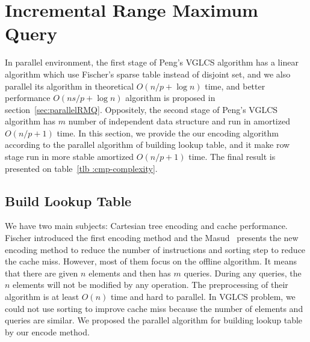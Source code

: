 \section{Incremental Range Maximum Query}
\label{sec:parallelIRMQ}

In parallel environment, the first stage of Peng's VGLCS algorithm has
a linear algorithm which use Fischer's sparse table instead of
disjoint set, and we also parallel its algorithm in theoretical $O(n /
p + \log n)$ time, and better performance $O(n s / p + \log n)$
algorithm is proposed in section~\ref{sec:parallelRMQ}.  Oppositely,
the second stage of Peng's VGLCS algorithm has $m$ number of
independent data structure and run in amortized $O(n / p + 1)$ time.
In this section, we provide the our encoding algorithm according to
the parallel algorithm of building lookup table, and it make row stage
run in more stable amortized $O(n / p + 1)$ time.  The final result is
presented on table~\ref{tlb :cmp-complexity}.

\iffalse VGLCS 問題主要分成縱向和橫向兩階段，縱向處理每一列的區間極值
查找，橫向處理每一行的區間極值查找，兩者合併構成區域極值查找。在縱向方
面為數個獨立的數據結構，這部分易於平行；相反地，在橫向方面，需要共同協
作一個數據結構。綜觀這兩者的差異，縱向需要動態的後綴插入和區間查詢，而
橫向可以離線完成區間查找。在上一節中，我們提出在橫向處理的實作，若限制
上述的實作方案在單一處理器上，時間複雜度的瓶頸在於縱向的動態更新與查找。
在這個章節中，我們提出支持動態插入和區間查找的數據結構，最後的成果如表
\ref{tlb:cmp-complexity}。
\fi




\subsection{Build Lookup Table}

We have two main subjects: Cartesian tree encoding and cache
performance.  Fischer introduced the first encoding method and the
Masud~\cite{Hasan2010CacheOA} presents the new encoding method to
reduce the number of instructions and sorting step to reduce the cache
miss.  However, most of them focus on the offline algorithm.  It means
that there are given $n$ elements and then has $m$ queries.  During
any queries, the $n$ elements will not be modified by any operation.
The preprocessing of their algorithm is at least $O(n)$ time and hard
to parallel.  In VGLCS problem, we could not use sorting to improve
cache miss because the number of elements and queries are similar.  We
proposed the parallel algorithm for building lookup table by our
encode method.

